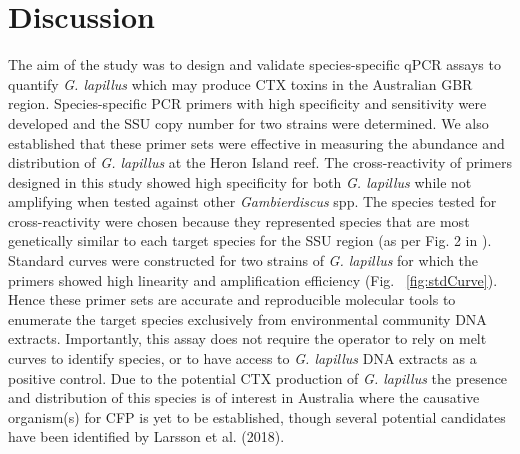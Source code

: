 \documentclass[12pt]{article}
\begin{document}
\section*{Discussion}
The aim of the study was to design and validate species-specific qPCR assays to quantify \emph{G. lapillus} %
which may produce CTX toxins in the Australian GBR region. 
Species-specific PCR primers with high specificity and sensitivity were developed and the SSU copy number for two strains were determined. 
We also established that these primer sets were effective in measuring the abundance and distribution of %
\textit{G. lapillus} at the Heron Island reef.
The cross-reactivity of primers designed in this study showed high specificity for both \emph{G. lapillus} %
while not amplifying when tested against other \emph{Gambierdiscus} spp. 
The species tested for cross-reactivity were chosen because they represented species that are most genetically similar to each target species for the SSU region (as per Fig. 2 in \citep{kretzschmar2017characterization}).
Standard curves were constructed for two strains of \emph{G. lapillus} %
for which the primers showed high linearity and amplification efficiency (Fig. ~\ref{fig:stdCurve}). 
Hence these primer sets are accurate and reproducible molecular tools to enumerate the target species exclusively from environmental community DNA extracts. 
Importantly, %
this assay does not require the operator to rely on melt curves to identify species, or to have access to \emph{G. lapillus} %
DNA extracts as a positive control. 
Due to the potential CTX production of \emph{G. lapillus} \citep{kretzschmar2017characterization,larsson2018toxicology} %
the presence and distribution of this species is of interest in Australia where the causative organism(s) for CFP is yet to be established, though several potential candidates have been identified by Larsson et al. (2018).\\
\end{document}
